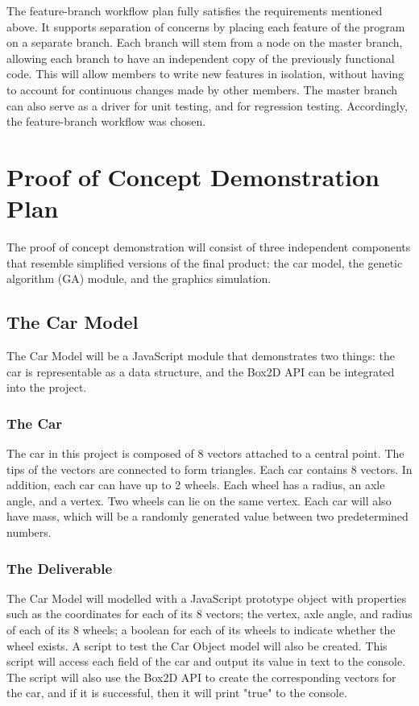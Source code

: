 \documentclass{article}
\begin{document}
The feature-branch workflow plan fully satisfies the requirements mentioned 
above. It supports separation of concerns by placing each feature of the program 
on a separate branch. Each branch will stem from a node on the master branch, 
allowing each branch to have an independent copy of the previously functional 
code. This will allow members to write new features in isolation, without having 
to account for continuous changes made by other members. The master branch can 
also serve as a driver for unit testing, and for regression testing. 
Accordingly, the feature-branch workflow was chosen.

\section{Proof of Concept Demonstration Plan}
The proof of concept demonstration will consist of three independent components 
that resemble simplified versions of the final product: the car model, the 
genetic algorithm (GA) module, and the graphics simulation. 

\subsection{The Car Model}
The Car Model will be a JavaScript module that demonstrates two things: the car 
is representable as a data structure, and the Box2D API can be integrated into 
the project. 

\subsubsection{The Car}
The car in this project is composed of 8 vectors attached to a central point. 
The 
tips of the vectors are connected to form triangles. Each car contains 8 
vectors. In addition, each car can have up to \textcolor{RoyalPurple}{2} wheels. 
Each wheel has a radius, 
an axle angle, and a vertex. Two wheels can lie on the same vertex. Each car 
will also have mass, which will be a randomly generated value between two 
predetermined numbers.

\subsubsection{The Deliverable}
The Car Model will modelled with a \textcolor{RoyalPurple}{JavaScript prototype 
object} with properties such as the coordinates for each of its 8 vectors; 
the vertex, axle angle, and radius of each of its 8 wheels; a boolean for each 
of its wheels to indicate whether the wheel exists. A script to test the 
\textcolor{RoyalPurple}{Car Object}
model will also be created. This script will access each field of the car and 
output its value in text to the console. The script will also use the Box2D API 
to create the corresponding vectors for the car, and if it is successful, then 
it will print "true" to the console.
\end{document}
